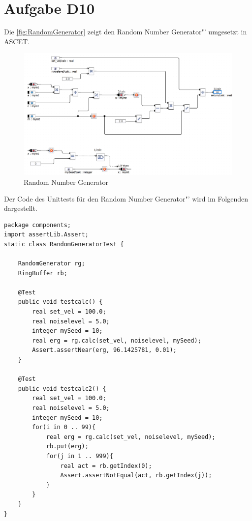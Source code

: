 
\chapter{Aufgabe D10}


Die \autoref{fig:RandomGenerator} zeigt den \glqq Random Number Generator"' umgesetzt in ASCET.

\begin{figure}[h!]
	\centering
	\includegraphics[width=1\linewidth]{../Graphiken/RandomGenerator.png}
	\caption{Random Number Generator}
	\label{fig:RandomGenerator}
\end{figure}

Der Code des Unittests für den \glqq Random Number Generator"' wird im Folgenden dargestellt.

\begin{lstlisting}
package components;
import assertLib.Assert;
static class RandomGeneratorTest {
	
	RandomGenerator rg;
	RingBuffer rb;
	
	@Test
	public void testcalc() {
		real set_vel = 100.0;
		real noiselevel = 5.0;
		integer mySeed = 10;
		real erg = rg.calc(set_vel, noiselevel, mySeed);
		Assert.assertNear(erg, 96.1425781, 0.01);
	}
	
	@Test
	public void testcalc2() {
		real set_vel = 100.0;
		real noiselevel = 5.0;
		integer mySeed = 10;
		for(i in 0 .. 99){
			real erg = rg.calc(set_vel, noiselevel, mySeed);
			rb.put(erg);
			for(j in 1 .. 999){
				real act = rb.getIndex(0);
				Assert.assertNotEqual(act, rb.getIndex(j));
			}
		}
	}
}
\end{lstlisting}